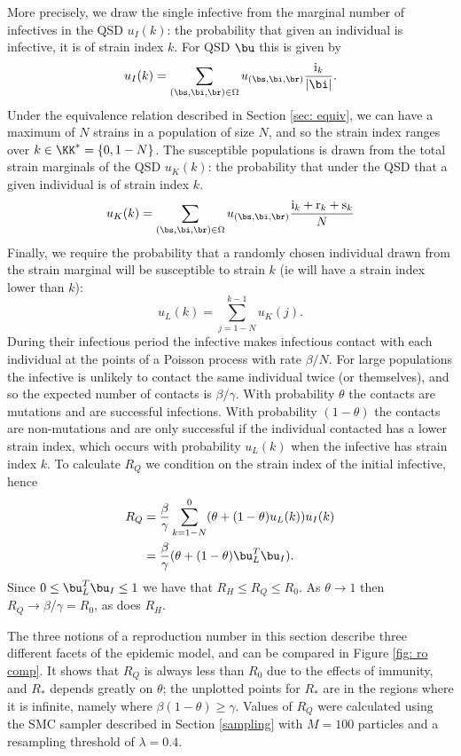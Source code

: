 \documentclass[review]{elsarticle}
\begin{document}
More precisely, we draw the single infective from the marginal number of infectives in the QSD $u_I(k)$: the probability that given an individual is infective, it is of strain index $k$. For QSD $\bu$ this is given by 
\[
	u_I(k) = \sum_{(\bs,\bi,\br) \in \Omega} u_{(\bs,\bi,\br)} \frac{{\rm i}_k }{ |\bi| }.
\]
Under the equivalence relation described in Section \ref{sec: equiv}, we can have a maximum of $N$ strains in a population of size $N$, and so the strain index ranges over $k \in \KK^* = \{0, 1-N\}$. The susceptible populations is drawn from the total strain marginals of the QSD $u_K(k)$: the probability that under the QSD that a given individual is of strain index $k$. 
\[
	u_K(k) = \sum_{(\bs,\bi,\br) \in \Omega} u_{(\bs,\bi,\br)} \frac{\textrm{i}_k + \textrm{r}_k + \textrm{s}_k}{N} 
\]
Finally, we require the probability that a randomly chosen individual drawn from the strain marginal will be susceptible to strain $k$ (ie will have a strain index lower than $k$):
\[u_L(k) = \sum_{j=1-N}^{k-1}u_K(j).\] 
During their infectious period the infective makes infectious contact with each individual at the points of a Poisson process with rate $\beta/N$. For large populations the infective is unlikely to contact the same individual twice (or themselves), and so the expected number of contacts is $\beta/\gamma$. With probability $\theta$ the contacts are mutations and are successful infections. With probability $(1-\theta)$ the contacts are non-mutations and are only successful if the individual contacted has a lower strain index, which occurs with probability $u_L(k)$ when the infective has strain index $k$. To calculate $R_Q$ we condition on the strain index of the initial infective, hence
\begin{align}\label{eqn: rq}
R_Q&=\frac{\beta}{\gamma}\sum\limits_{k=1-N}^{0}(\theta + (1-\theta)u_L(k))u_I(k)\nonumber\\
&=\frac{\beta}{\gamma}(\theta+(1-\theta)\bu_L^T\bu_I).
\end{align}  
Since $0\leq\bu_L^T\bu_I\leq1$ we have that $R_H\leq R_Q\leq R_0$. As $\theta \rightarrow 1$ then $R_Q\rightarrow\beta/\gamma=R_0$, as does $R_H$. 

The three notions of a reproduction number in this section describe three different facets of the epidemic model, and can be compared in Figure \ref{fig: ro comp}. It shows that $R_Q$ is always less than $R_0$ due to the effects of immunity, and $R_*$ depends greatly on $\theta$; the unplotted points for $R_*$ are in the regions where it is infinite, namely where $\beta(1-\theta) \geq \gamma$. Values of $R_Q$ were calculated using the SMC sampler described in Section \ref{sampling} with $M=100$ particles and a resampling threshold of $\lambda=0.4$.
\end{document}
